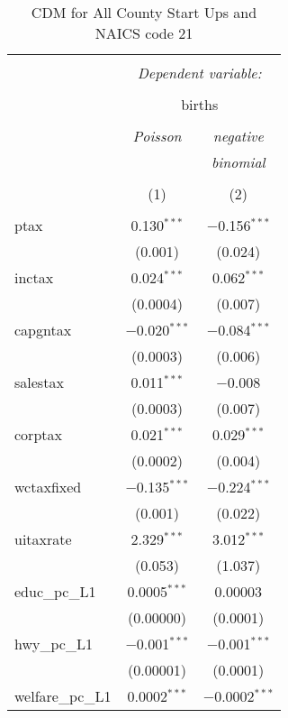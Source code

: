 
\begin{table}[!htbp] \centering 
  \caption{CDM for All County Start Ups and NAICS code 21} 
  \label{} 
\begin{tabular}{@{\extracolsep{5pt}}lcc} 
\\[-1.8ex]\hline 
\hline \\[-1.8ex] 
 & \multicolumn{2}{c}{\textit{Dependent variable:}} \\ 
\cline{2-3} 
\\[-1.8ex] & \multicolumn{2}{c}{births} \\ 
\\[-1.8ex] & \textit{Poisson} & \textit{negative} \\ 
 & \textit{} & \textit{binomial} \\ 
\\[-1.8ex] & (1) & (2)\\ 
\hline \\[-1.8ex] 
 ptax & 0.130$^{***}$ & $-$0.156$^{***}$ \\ 
  & (0.001) & (0.024) \\ 
  inctax & 0.024$^{***}$ & 0.062$^{***}$ \\ 
  & (0.0004) & (0.007) \\ 
  capgntax & $-$0.020$^{***}$ & $-$0.084$^{***}$ \\ 
  & (0.0003) & (0.006) \\ 
  salestax & 0.011$^{***}$ & $-$0.008 \\ 
  & (0.0003) & (0.007) \\ 
  corptax & 0.021$^{***}$ & 0.029$^{***}$ \\ 
  & (0.0002) & (0.004) \\ 
  wctaxfixed & $-$0.135$^{***}$ & $-$0.224$^{***}$ \\ 
  & (0.001) & (0.022) \\ 
  uitaxrate & 2.329$^{***}$ & 3.012$^{***}$ \\ 
  & (0.053) & (1.037) \\ 
  educ\_pc\_L1 & 0.0005$^{***}$ & 0.00003 \\ 
  & (0.00000) & (0.0001) \\ 
  hwy\_pc\_L1 & $-$0.001$^{***}$ & $-$0.001$^{***}$ \\ 
  & (0.00001) & (0.0001) \\ 
  welfare\_pc\_L1 & 0.0002$^{***}$ & $-$0.0002$^{***}$ \\ 

\end{tabular}
\end{table}
